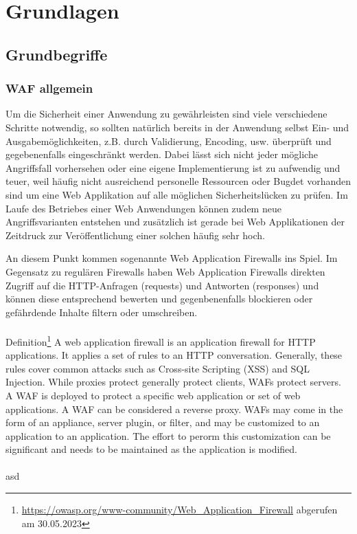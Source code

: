 \chapter{Grundlagen}


\section{Grundbegriffe}
\subsection{WAF allgemein}
Um die Sicherheit einer Anwendung zu gewährleisten sind viele verschiedene Schritte notwendig, so sollten natürlich bereits in der Anwendung selbst Ein- und Ausgabemöglichkeiten, z.B. durch Validierung, Encoding, usw. überprüft und gegebenenfalls eingeschränkt werden. Dabei lässt sich nicht jeder mögliche Angriffsfall vorhersehen oder eine eigene Implementierung ist zu aufwendig und teuer, weil häufig nicht ausreichend personelle Ressourcen oder Bugdet vorhanden sind um eine Web Applikation auf alle möglichen Sicherheitslücken zu prüfen. Im Laufe des Betriebes einer Web Anwendungen können zudem neue Angriffsvarianten entstehen und zusätzlich ist gerade bei Web Applikationen der Zeitdruck zur Veröffentlichung einer solchen häufig sehr hoch.

An diesem Punkt kommen sogenannte Web Application Firewalls ins Spiel. Im Gegensatz zu regulären Firewalls haben Web Application Firewalls direkten Zugriff auf die HTTP-Anfragen (requests) und Antworten (responses) und können diese entsprechend bewerten und gegenbenenfalls blockieren oder gefährdende Inhalte filtern oder umschreiben.\\\\
\textcolor{bhtGray}{ Definition\footnote{\url{https://owasp.org/www-community/Web_Application_Firewall} abgerufen am 30.05.2023}} A web application firewall is an application firewall for HTTP applications. It applies a set of rules to an HTTP conversation. Generally, these rules cover common attacks such as Cross-site Scripting (XSS) and SQL Injection. While proxies protect generally protect clients, WAFs protect servers. A WAF is deployed to protect a specific web application or set of web applications. A WAF can be considered a reverse proxy. WAFs may come in the form of an appliance, server plugin, or filter, and may be customized to an application to an application. The effort to perorm this customization can be significant and needs to be maintained as the application is modified.\\\\
asd



